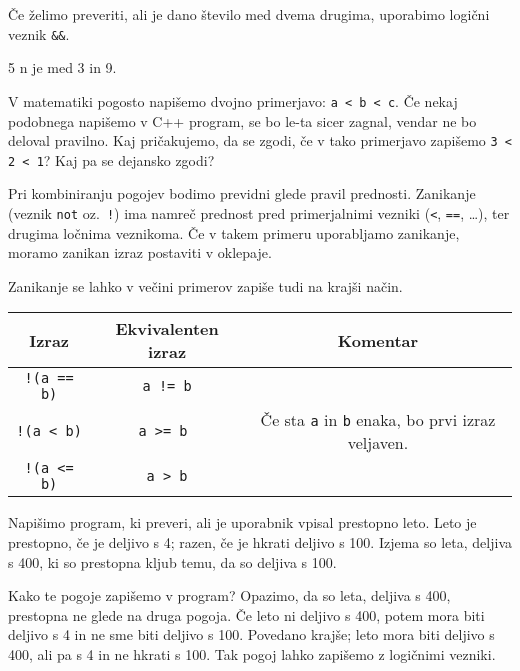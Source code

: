 \begin{examples}

Če želimo preveriti, ali je dano število med dvema drugima, uporabimo
logični veznik \verb+&&+.


\begin{inout}
5
\tcblower
n je med 3 in 9.
\end{inout}

\end{examples}

\begin{errors}
  V matematiki pogosto napišemo dvojno primerjavo: \verb+a < b < c+.
  Če nekaj podobnega napišemo v C++ program, se bo le-ta sicer zagnal, vendar
  ne bo deloval pravilno. Kaj pričakujemo, da se zgodi, če v tako primerjavo
  zapišemo \verb+3 < 2 < 1+? Kaj pa se dejansko zgodi?
\end{errors}

Pri kombiniranju pogojev bodimo previdni glede pravil prednosti. Zanikanje
(veznik \verb+not+ oz.~\verb+!+) ima namreč prednost pred primerjalnimi
vezniki (\verb+<+, \verb+==+, \ldots), ter drugima ločnima veznikoma.
Če v takem primeru uporabljamo zanikanje, moramo zanikan izraz postaviti
v oklepaje.

\begin{examples}
  Zanikanje se lahko v večini primerov zapiše tudi na krajši način.

  \begin{tabular}{|c|c|c|}
	\hline
	Izraz & Ekvivalenten izraz & Komentar \\
	\hline
	\verb+!(a == b)+ & \verb+a != b+ & \\
	\verb+!(a < b)+ & \verb+a >= b + & Če sta \verb+a+ in \verb+b+ enaka, bo prvi izraz veljaven. \\
	\verb+!(a <= b)+ & \verb+a > b+ & \\
	\hline
  \end{tabular}
\end{examples}

\begin{examples}
Napišimo program, ki preveri, ali je uporabnik vpisal prestopno leto.
Leto je prestopno, če je deljivo s 4; razen, če je hkrati deljivo s 100. Izjema so leta, deljiva
s 400, ki so prestopna kljub temu, da so deljiva s 100.

Kako te pogoje zapišemo v program? Opazimo, da so leta, deljiva s 400,
prestopna ne glede na druga pogoja. Če leto ni deljivo s 400, potem mora biti
deljivo s 4 in ne sme biti deljivo s 100. Povedano krajše; leto mora biti
deljivo s 400, ali pa s 4 in ne hkrati s 100. Tak pogoj lahko zapišemo z
logičnimi vezniki.


\end{examples}

